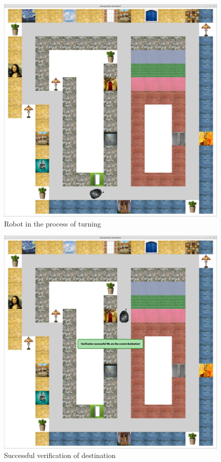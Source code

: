 \documentclass[11pt,letterpaper]{article}
\begin{document}
\begin{figure}[ht!]
\includegraphics[scale=0.15]{robotturning.pdf}
\caption{Robot in the process of turning}\label{fig:robotturning}
\end{figure}

\begin{figure}[ht!]
\includegraphics[scale=0.15]{verifysuccess.pdf}
\caption{Successful verification of destination}\label{fig:verifysuccess}
\end{figure}
\end{document}
